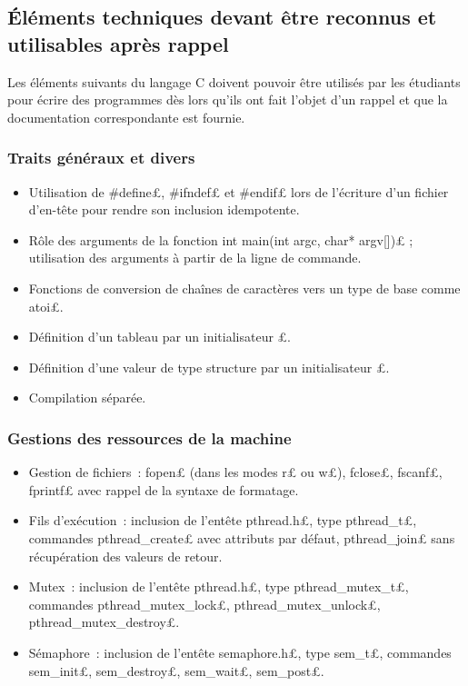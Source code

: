 \subsection{Éléments techniques devant être reconnus et utilisables après rappel}
Les éléments suivants du langage C doivent pouvoir être utilisés par les étudiants pour écrire des programmes dès lors qu'ils ont fait l'objet d'un rappel et que la documentation correspondante est fournie.

\subsubsection*{Traits généraux et divers}

\begin{itemize}
\item Utilisation de \£#define£, \£#ifndef£ et \£#endif£ lors de l'écriture d'un fichier d'en-tête pour rendre son inclusion idempotente. %
\item Rôle des arguments de la fonction \£int main(int argc, char* argv[])£ ; utilisation des arguments à partir de la ligne de commande.
\item Fonctions de conversion de chaînes de caractères vers un type de base comme \£atoi£.
\item Définition d'un tableau par un initialisateur £.
\item Définition d'une valeur de type structure par un initialisateur £.
\item Compilation séparée.
\end{itemize}

\subsubsection*{Gestions des ressources de la machine}

\begin{itemize}
\item Gestion de fichiers~: \£fopen£ (dans les modes \£r£ ou \£w£), \£fclose£, \£fscanf£, \£fprintf£ avec rappel de la syntaxe de formatage.
\item Fils d'exécution~: inclusion de l'entête \£pthread.h£, type \£pthread_t£, commandes \£pthread_create£ avec attributs par défaut, \£pthread_join£ sans récupération des valeurs de retour.
\item Mutex~: inclusion de l'entête \£pthread.h£, type \£pthread_mutex_t£, commandes \£pthread_mutex_lock£, \£pthread_mutex_unlock£, \£pthread_mutex_destroy£.
\item Sémaphore~: inclusion de l'entête \£semaphore.h£, type \£sem_t£, commandes \£sem_init£, \£sem_destroy£, \£sem_wait£, \£sem_post£.
\end{itemize}
